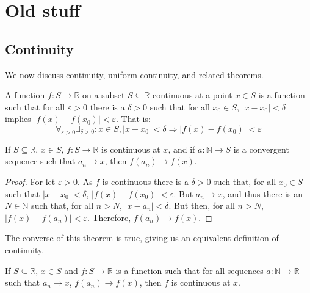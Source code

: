     \section{Old stuff}
        \subsection{Continuity}
            We now discuss continuity, uniform continuity, and
            related theorems.
            \begin{definition}
                A function $f:S\rightarrow\mathbb{R}$
                on a subset $S\subseteq\mathbb{R}$ continuous
                at a point $x\in{S}$ is a function such that
                for all $\varepsilon>0$ there is a $\delta>0$
                such that for all $x_{0}\in{S}$,
                $|x-x_{0}|<\delta$ implies
                $|f(x)-f(x_{0})|<\varepsilon$. That is:
                \begin{equation}
                    \forall_{\varepsilon>0}\exists_{\delta>0}:
                    x\in{S},|x-x_{0}|<\delta
                    \Rightarrow|f(x)-f(x_{0})|<\varepsilon
                \end{equation}
            \end{definition}
            \begin{theorem}
                If $S\subseteq\mathbb{R}$, $x\in{S}$,
                $f:S\rightarrow\mathbb{R}$
                is continuous at $x$, and if
                $a:\mathbb{N}\rightarrow{S}$
                is a convergent sequence such that
                $a_{n}\rightarrow{x}$, then
                $f(a_{n})\rightarrow{f(x)}$.
            \end{theorem}
            \begin{proof}
                For let $\varepsilon>0$. As $f$ is
                continuous there is a $\delta>0$ such that,
                for all $x_{0}\in{S}$
                such that $|x-x_{0}|<\delta$,
                $|f(x)-f(x_{0})|<\varepsilon$.
                But $a_{n}\rightarrow{x}$, and thus there is an
                $N\in\mathbb{N}$ such that, for all $n>N$,
                $|x-a_{n}|<\delta$. But then, for all $n>N$,
                $|f(x)-f(a_{n})|<\varepsilon$. Therefore,
                $f(a_{n})\rightarrow{f(x)}$.
            \end{proof}
            The converse of this theorem is true, giving us
            an equivalent definition of continuity.
            \begin{theorem}
                If $S\subseteq\mathbb{R}$, $x\in{S}$ and
                $f:S\rightarrow\mathbb{R}$
                is a function such that for all sequences
                $a:\mathbb{N}\rightarrow\mathbb{R}$ such that
                $a_{n}\rightarrow{x}$,
                $f(a_{n})\rightarrow{f(x)}$,
                then $f$ is continuous at $x$.
            \end{theorem}
